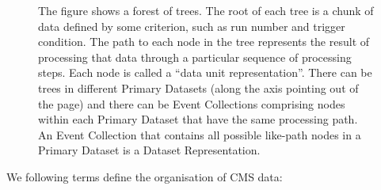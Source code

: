 \documentclass{cmspaper}
\begin{document}
\begin{figure}[hbtp]
  \begin{center}
    \caption{The figure shows a forest of trees.  The root of each tree is a 
chunk of data defined by some criterion, such as run number and trigger condition.
The path to each node in the tree represents the result of processing that 
data through a particular sequence of processing steps.  Each node is called 
a ``data unit representation''.  There can be trees in different Primary Datasets (along the 
axis pointing out of the page) and there can be Event Collections comprising nodes 
within each Primary Dataset that have the same processing path. An Event Collection 
that contains all possible like-path nodes in a Primary Dataset is a Dataset 
Representation.}
    \label{fig:forest}
  \end{center}
\end{figure}

We following terms define the organisation of CMS data:
\end{document}
